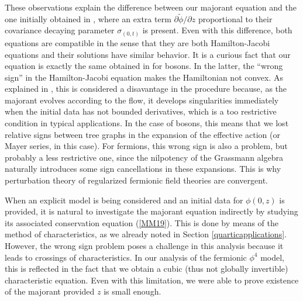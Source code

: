 \documentclass[12pt,twoside]{amsart}
\numberwithin{equation}{section}
\newcommand{\enquote}[1]{``#1''}
\begin{document}
These observations explain the difference between our majorant equation and the one initially obtained in \cite{BryWri}, where an extra term $\partial\tilde{\phi}/\partial z$ proportional to their covariance decaying parameter $\sigma_{(0,t)}$ is present. Even with this difference, both equations are compatible in the sense that they are both Hamilton-Jacobi equations and their solutions have similar behavior. It is a curious fact that our equation is exactly the same obtained in \cite{BryKen} for bosons. In the latter, the \enquote{wrong sign} in the Hamilton-Jacobi equation makes the Hamiltonian not convex. As explained in \cite{BryKen, BryWri}, this is considered a disavantage in the procedure because, as the majorant evolves according to the flow, it develops singularities immediately when the initial data has not bounded derivatives, which is a too restrictive condition in typical applications. In the case of bosons, this means that we lost relative signs between tree graphs in the expansion of the effective action (or Mayer series, in this case). For fermions, this wrong sign is also a problem, but probably a less restrictive one, since the nilpotency of the Grassmann algebra naturally introduces some sign cancellations in these expansions. This is why perturbation theory of regularized fermionic field theories are convergent.

When an explicit model is being considered and an initial data for $\phi(0,z)$ is provided, it is natural to investigate the majorant equation indirectly by studying its associated conservation equation (\ref{MM19}). This is done by means of the method of characteristics, as we already noted in Section \ref{quarticapplications}. However, the wrong sign problem poses a challenge in this analysis because it leads to crossings of characteristics. In our analysis of the fermionic $\phi^{4}$ model, this is reflected in the fact that we obtain a cubic (thus not globally invertible) characteristic equation. Even with this limitation, we were able to prove existence of the majorant provided $z$ is small enough. 
\end{document}
